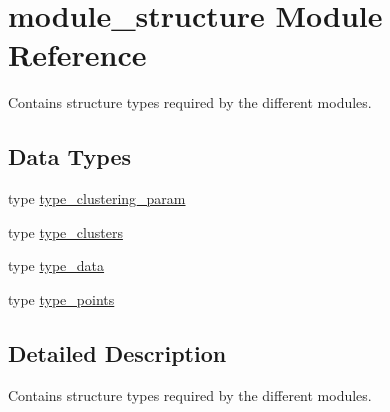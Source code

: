 \hypertarget{namespacemodule__structure}{}\section{module\+\_\+structure Module Reference}
\label{namespacemodule__structure}


Contains structure types required by the different modules.  


\subsection*{Data Types}
\begin{DoxyCompactItemize}
\item 
type \hyperlink{structmodule__structure_1_1type__clustering__param}{type\+\_\+clustering\+\_\+param}
\item 
type \hyperlink{structmodule__structure_1_1type__clusters}{type\+\_\+clusters}
\item 
type \hyperlink{structmodule__structure_1_1type__data}{type\+\_\+data}
\item 
type \hyperlink{structmodule__structure_1_1type__points}{type\+\_\+points}
\end{DoxyCompactItemize}


\subsection{Detailed Description}
Contains structure types required by the different modules. 